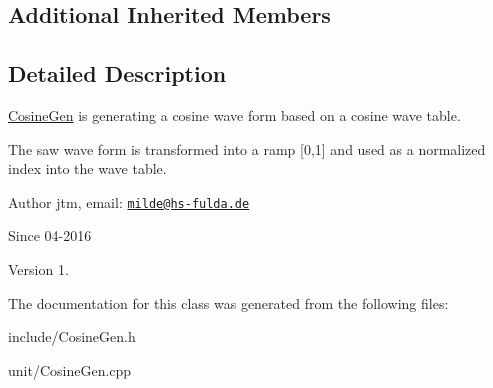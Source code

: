 \subsection*{Additional Inherited Members}


\subsection{Detailed Description}
\hyperlink{classunit_1_1CosineGen}{Cosine\+Gen} is generating a cosine wave form based on a cosine wave table.

The saw wave form is transformed into a ramp \mbox{[}0,1\mbox{]} and used as a normalized index into the wave table.

\begin{DoxyAuthor}{Author}
jtm, email\+:  \href{mailto:milde@hs-fulda.de}{\tt milde@hs-\/fulda.\+de} 
\end{DoxyAuthor}
\begin{DoxySince}{Since}
04-\/2016 
\end{DoxySince}
\begin{DoxyVersion}{Version}
1. 
\end{DoxyVersion}


The documentation for this class was generated from the following files\+:\begin{DoxyCompactItemize}
\item 
include/Cosine\+Gen.\+h\item 
unit/Cosine\+Gen.\+cpp\end{DoxyCompactItemize}
